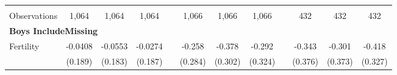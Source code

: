 \begin{landscape}
\begin{table}[htpb!]
\begin{center}
\begin{tabular}{lcccp{2mm}cccp{2mm}ccc}
\begin{footnotesize}\end{footnotesize}&\begin{footnotesize}\end{footnotesize}&\begin{footnotesize}\end{footnotesize}&\begin{footnotesize}\end{footnotesize}&\begin{footnotesize}\end{footnotesize}&\begin{footnotesize}\end{footnotesize}&\begin{footnotesize}\end{footnotesize}&\begin{footnotesize}\end{footnotesize}&\begin{footnotesize}\end{footnotesize}&\begin{footnotesize}\end{footnotesize}&\begin{footnotesize}\end{footnotesize}&\begin{footnotesize}\end{footnotesize}\\Observations&1,064&1,064&1,064&&1,066&1,066&1,066&&432&432&432\\
\multicolumn{12}{l}{\textbf{Boys IncludeMissing}}\\ 
Fertility&-0.0408&-0.0553&-0.0274&&-0.258&-0.378&-0.292&&-0.343&-0.301&-0.418\\
&(0.189)&(0.183)&(0.187)&&(0.284)&(0.302)&(0.324)&&(0.376)&(0.373)&(0.327)\\

\end{tabular}
\end{center}
\end{table}
\end{landscape}
